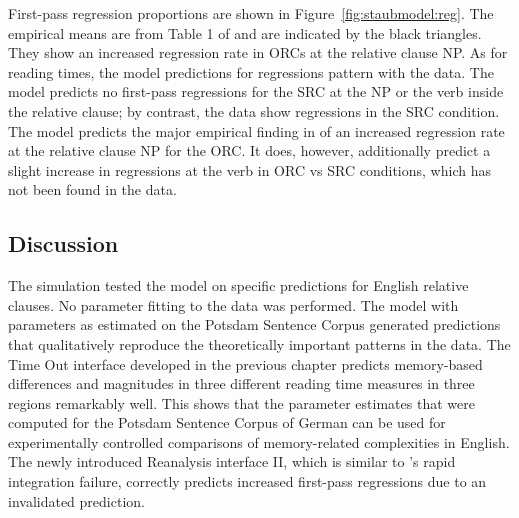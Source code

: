 \documentclass{cambridge7A}\usepackage[]{graphicx}\usepackage[]{color}
\begin{document}
First-pass regression proportions are shown in Figure~\ref{fig:staubmodel:reg}. The empirical means are from Table 1 of \cite{Staub2010a} and are indicated by the black triangles. They show an increased regression rate in ORCs at the relative clause NP. 
As for reading times, the model predictions for regressions pattern with the data. The model predicts no first-pass regressions for the SRC at the NP or the verb inside the relative clause; by contrast, the data show regressions in the SRC condition. The model predicts the major empirical finding in \cite{Staub2010a} of an increased regression rate at the relative clause NP for the ORC. It does, however, additionally predict a slight increase in regressions at the verb in ORC vs SRC conditions, which has not been found in the data.

\subsection{Discussion}
The simulation tested the model on specific predictions for English relative clauses. No parameter fitting to the data was performed. The model with parameters as estimated on the Potsdam Sentence Corpus generated predictions that  qualitatively reproduce the theoretically important patterns in the data. The Time Out interface developed in the previous chapter predicts memory-based differences and magnitudes in three different reading time measures in three regions remarkably well. This shows that the parameter estimates that were computed for the Potsdam Sentence Corpus of German can be used for experimentally controlled comparisons of memory-related complexities in English. The newly introduced Reanalysis interface II, which is similar to \cite{ReichleWarrenMcConnell2009}'s rapid integration failure, correctly predicts increased first-pass regressions due to an invalidated prediction. 
\end{document}
